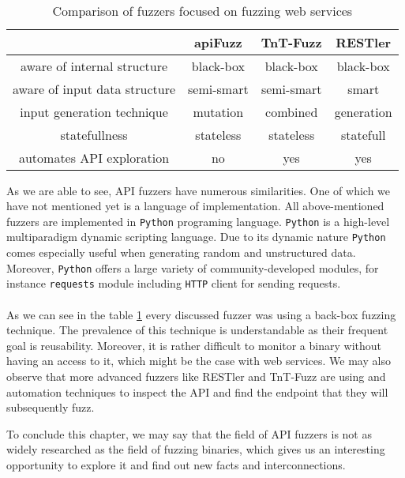 \paragraph{}
\begin{table}[h]
\begin{center}
\begin{tabular}{|c|c c c|}
\hline
                              & apiFuzz    & TnT-Fuzz   & RESTler    \\
\hline
aware of internal structure   & black-box  & black-box  & black-box  \\
aware of input data structure & semi-smart & semi-smart & smart      \\
input generation technique    & mutation   & combined   & generation \\
statefullness                 & stateless  & stateless  & statefull  \\
automates API exploration     & no         & yes        & yes        \\
\hline
\end{tabular}
\caption{Comparison of fuzzers focused on fuzzing web services}
\label{table:fuzzers-comparison}
\end{center}
\end{table}

As we are able to see, API fuzzers have numerous similarities. One of which we have not mentioned yet is a language of implementation. All above-mentioned fuzzers are implemented in \texttt{Python} programing language. \texttt{Python} is a high-level multiparadigm dynamic scripting language. Due to its dynamic nature \texttt{Python} comes especially useful when generating random and unstructured data. Moreover, \texttt{Python} offers a large variety of community-developed modules, for instance \texttt{requests} module including \texttt{HTTP} client for sending requests.

\paragraph{}
As we can see in the table \ref{table:fuzzers-comparison} every discussed fuzzer was using a back-box fuzzing technique. The prevalence of this technique is understandable as their frequent goal is reusability. Moreover, it is rather difficult to monitor a binary without having an access to it, which might be the case with web services. We may also observe that more advanced fuzzers like RESTler and TnT-Fuzz are using and automation techniques to inspect the API and find the endpoint that they will subsequently fuzz.

To conclude this chapter, we may say that the field of API fuzzers is not as widely researched as the field of fuzzing binaries, which gives us an interesting opportunity to explore it and find out new facts and interconnections.
